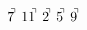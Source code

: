 \documentclass[preview]{standalone}
\begin{document}
\begin{align*}
7^{\hspace{-0.1cm}\urcorner} \ 11^{\hspace{-0.1cm}\urcorner} \ 2^{\hspace{-0.1cm}\urcorner} \ 5^{\hspace{-0.1cm}\urcorner} \ 9^{\hspace{-0.1cm}\urcorner}
\end{align*}
\end{document}
